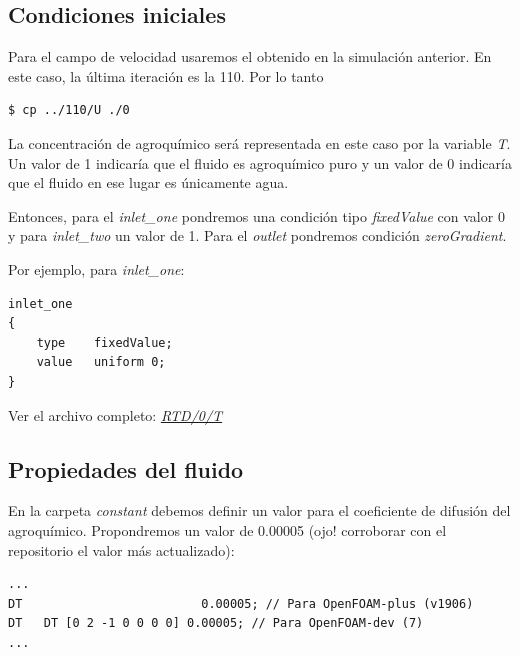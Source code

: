 \documentclass{article}
\begin{document}
\subsection{Condiciones iniciales}
Para el campo de velocidad usaremos el obtenido en la simulación anterior. En este caso, la última iteración es la 110. Por lo tanto

\begin{lstlisting}
$ cp ../110/U ./0
\end{lstlisting}

La concentración de agroquímico será representada en este caso por la variable \textit{T}. Un valor de 1 indicaría que el fluido es agroquímico puro y un valor de 0 indicaría que el fluido en ese lugar es únicamente agua.

Entonces, para el \textit{inlet\_one} pondremos una condición tipo \textit{fixedValue} con valor 0 y para \textit{inlet\_two} un valor de 1. Para el \textit{outlet} pondremos condición \textit{zeroGradient}.

Por ejemplo, para \textit{inlet\_one}:
\begin{lstlisting}
inlet_one 
{
	type	fixedValue;
	value	uniform 0;
}
\end{lstlisting}

Ver el archivo completo: \textit{\href{https://github.com/guillerolle/adscripcion_cfd/blob/master/01/RTD/0/T}{RTD/0/T}}

%

\subsection{Propiedades del fluido}
En la carpeta \textit{constant} debemos definir un valor para el coeficiente de difusión del agroquímico. Propondremos un valor de 0.00005 (ojo! corroborar con el repositorio el valor más actualizado):

\bigskip\bigskip

\begin{lstlisting}
...
DT                         0.00005; // Para OpenFOAM-plus (v1906)
DT   DT [0 2 -1 0 0 0 0] 0.00005; // Para OpenFOAM-dev (7)
...
\end{lstlisting}
\end{document}
